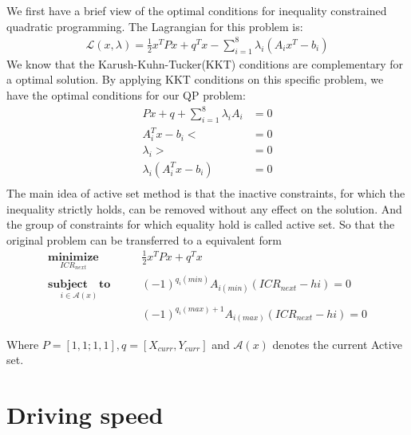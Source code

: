 We first have a brief view of the optimal conditions for inequality constrained quadratic programming. The Lagrangian for this problem is:
\begin{equation}\label{eq:Lagrangian}
	\begin{split}
		\mathcal{L}(x,\lambda)=\frac{1}{2}x^TPx + q^Tx - \sum_{i=1}^8\lambda_i(A_ix^T-b_i)
	\end{split}
\end{equation}
We know that the Karush-Kuhn-Tucker(KKT) conditions are complementary for a optimal solution. By applying KKT conditions on this specific problem, we have the optimal conditions for our QP problem:
\begin{equation}\label{eq:Lagrangian}
	\begin{split}
		Px+q+\sum_{i=1}^8\lambda_i A_i &=0\\
		A_i^Tx-b_i <&=0\\
		\lambda_i >&=0\\
		\lambda_i(A_i^Tx-b_i) &=0\\
	\end{split}
\end{equation}
The main idea of active set method is that the inactive constraints, for which the inequality strictly holds, can be removed without any effect on the solution. And the group of constraints for which equality hold is called active set. So that the original problem can be transferred to a equivalent form
\begin{equation} \label{eq:QP}
	\begin{split}
		\underset{ICR_{next}}{\textbf{minimize}} \qquad &\frac{1}{2}x^TPx + q^Tx\\
		\underset{i\in\mathcal{A}(x)}{\textbf{subject} \quad \textbf{to}} \qquad &(-1)^{q_i(min)}A_{i(min)}(ICR_{next}-hi)=0\\
												  &(-1)^{q_i(max)+1}A_{i(max)}(ICR_{next}-hi)=0
	\end{split}
\end{equation}

Where $P=[1,1;1,1], q=[X_{curr},Y_{curr}]$ and $\mathcal{A}(x)$ denotes the current Active set.














\section{Driving speed}

